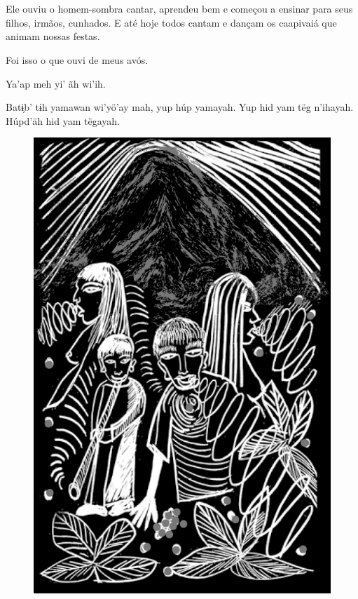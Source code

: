 \chapter*{}

\mbox{}\vspace*{\fill}

Ele ouviu o homem-sombra cantar,
aprendeu bem e
começou a ensinar
para seus filhos,
irmãos, cunhados.
E até hoje todos
cantam e dançam os
caapivaiá que animam
nossas festas.

Foi isso o que ouvi de
meus avós.

\bigskip

Ya’ap meh yi’ ãh wi’ih.

Batɨ̗b’ tɨh yamawan
wi’yö’ay mah, yup húp
yamayah. Yup hid yam
tëg n’ihayah. Húpd’äh
hid yam tëgayah.

\vspace*{\fill}

\begin{figure}
\vspace*{-1.2cm}
\hspace*{-2.2cm}\includegraphics[width=138mm]{./imgs/img9.jpg}
\end{figure}

